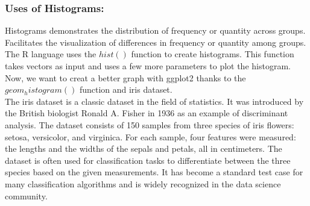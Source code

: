 \documentclass{article}\usepackage[]{graphicx}\usepackage[]{xcolor}
\begin{document}
\subsubsection{Uses of Histograms:}
Histograms demonstrates the distribution of frequency or quantity across groups.\\
Facilitates the visualization of differences in frequency or quantity among groups.\\
The R language uses the $hist()$ function to create histograms. This function takes vectors as input and uses a few more parameters to plot the histogram.\\
Now, we want to creat a better graph with ggplot2 thanks to the $geom_histogram()$ function and iris dataset.\\
The iris dataset is a classic dataset in the field of statistics. It was introduced by the British biologist Ronald A. Fisher in 1936 as an example of discriminant analysis. The dataset consists of 150 samples from three species of iris flowers: setosa, versicolor, and virginica. For each sample, four features were measured: the lengths and the widths of the sepals and petals, all in centimeters. The dataset is often used for classification tasks to differentiate between the three species based on the given measurements. It has become a standard test case for many classification algorithms and is widely recognized in the data science community.\\
\end{document}
